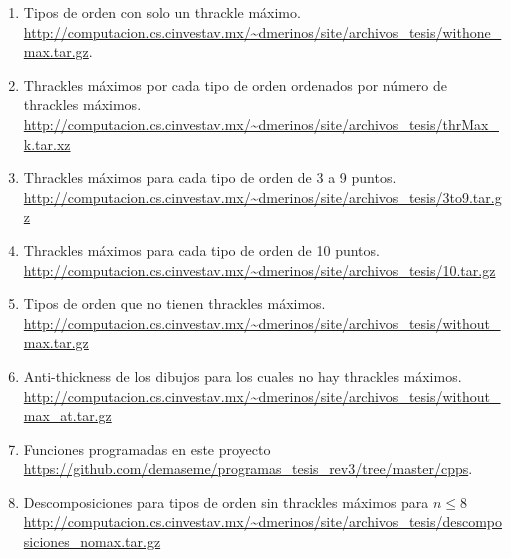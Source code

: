\label{apendice-ligas}
\begin{enumerate}
  \item Tipos de orden con solo un thrackle máximo.
  \label{link-withone}
  \url{http://computacion.cs.cinvestav.mx/~dmerinos/site/archivos_tesis/withone_max.tar.gz}.
  \item Thrackles máximos por cada tipo de orden ordenados por número de thrackles máximos.
  \label{link-thrMax_k}
  \url{http://computacion.cs.cinvestav.mx/~dmerinos/site/archivos_tesis/thrMax_k.tar.xz}
  \item Thrackles máximos para cada tipo de orden de 3 a 9 puntos.
  \label{link-3to9}
  \url{http://computacion.cs.cinvestav.mx/~dmerinos/site/archivos_tesis/3to9.tar.gz}
  \item Thrackles máximos para cada tipo de orden de 10 puntos.
  \label{link-10}
  \url{http://computacion.cs.cinvestav.mx/~dmerinos/site/archivos_tesis/10.tar.gz}
  \item Tipos de orden que no tienen thrackles máximos.
  \label{link-thrWithoutMax}
  \url{http://computacion.cs.cinvestav.mx/~dmerinos/site/archivos_tesis/without_max.tar.gz}
  \item Anti-thickness de los dibujos para los cuales no hay thrackles máximos.
  \label{link-thrWithoutMax-at}
  \url{http://computacion.cs.cinvestav.mx/~dmerinos/site/archivos_tesis/without_max_at.tar.gz}
  \item Funciones programadas en este proyecto
  \label{link-github}
  \url{https://github.com/demaseme/programas_tesis_rev3/tree/master/cpps}.
  \item Descomposiciones para tipos de orden sin thrackles máximos para $n\leq 8$
  \label{link-decomposiciones-nomax}
  \url{http://computacion.cs.cinvestav.mx/~dmerinos/site/archivos_tesis/descomposiciones_nomax.tar.gz}
\end{enumerate}
